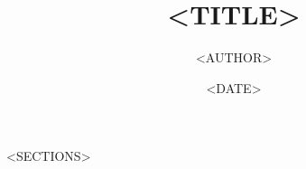 \documentclass[aspectratio=169]{beamer}
\title{<TITLE>}
\author{<AUTHOR>}
\institute{<INSTITUTE>}
\date{<DATE>}
\begin{document}
\frame{\titlepage}

<SECTIONS>
\end{document}
